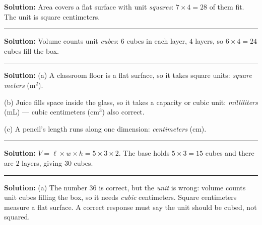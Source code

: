 \documentclass[12pt]{article}
\begin{document}



\textbf{Solution:} Area covers a flat surface with unit \emph{squares}:
$7 \times 4 = 28$ of them fit. The unit is square centimeters.

\vspace{0.2cm}\noindent\rule{\linewidth}{0.2pt}\vspace{0.1cm}


\textbf{Solution:} Volume counts unit \emph{cubes}: $6$ cubes in each layer,
$4$ layers, so $6 \times 4 = 24$ cubes fill the box.

\vspace{0.2cm}\noindent\rule{\linewidth}{0.2pt}\vspace{0.1cm}


\textbf{Solution:}
(a) A classroom floor is a flat surface, so it takes square units:
\emph{square meters} (m$^2$).

(b) Juice fills space inside the glass, so it takes a capacity or cubic
unit: \emph{milliliters} (mL) --- cubic centimeters (cm$^3$) also correct.

(c) A pencil's length runs along one dimension: \emph{centimeters} (cm).

\vspace{0.2cm}\noindent\rule{\linewidth}{0.2pt}\vspace{0.1cm}


\textbf{Solution:} $V = \ell \times w \times h = 5 \times 3 \times 2$. The
base holds $5 \times 3 = 15$ cubes and there are $2$ layers, giving $30$
cubes. 

\vspace{0.2cm}\noindent\rule{\linewidth}{0.2pt}\vspace{0.1cm}


\textbf{Solution:}
(a) The number $36$ is correct, but the \emph{unit} is wrong: volume counts
unit cubes filling the box, so it needs \emph{cubic} centimeters. Square
centimeters measure a flat surface. A correct response must say the unit
should be cubed, not squared.
\end{document}
